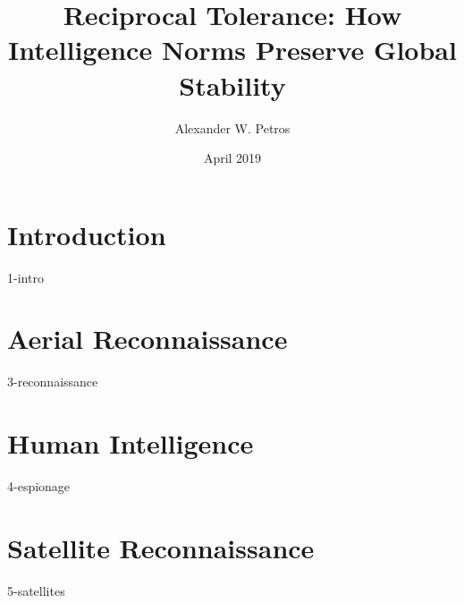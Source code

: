 \documentclass{report}
\title{Reciprocal Tolerance: How Intelligence Norms Preserve Global Stability}
\author{Alexander W. Petros}
\date{April 2019}
\begin{document}
    \maketitle
    \tableofcontents
    \newpage

    \chapter{Introduction}
    {1-intro}

    \chapter{Aerial Reconnaissance}
    {3-reconnaissance}

    \chapter{Human Intelligence}
    {4-espionage}

    \chapter{Satellite Reconnaissance}
    {5-satellites}
\end{document}
